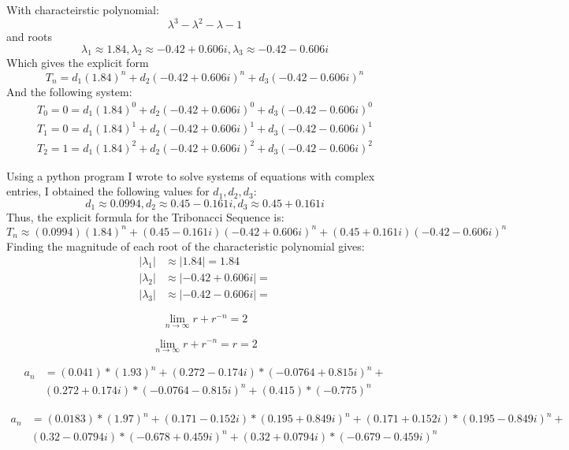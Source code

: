 \documentclass[11pt]{article}
\begin{document}
With characteirstic polynomial:
\[\lambda^3-\lambda^2-\lambda-1\]
and roots
\[\lambda_1 \approx 1.84, \lambda_2 \approx -0.42 + 0.606i, \lambda_3 \approx -0.42 - 0.606i\]
Which gives the explicit form
\[T_n=d_1(1.84)^n+d_2(-0.42 + 0.606i)^n+d_3(-0.42 - 0.606i)^n\]
And the following system:
\begin{align*}
    T_0=0=d_1(1.84)^0+d_2(-0.42 + 0.606i)^0+d_3(-0.42 - 0.606i)^0 \\
    T_1=0=d_1(1.84)^1+d_2(-0.42 + 0.606i)^1+d_3(-0.42 - 0.606i)^1 \\
    T_2=1=d_1(1.84)^2+d_2(-0.42 + 0.606i)^2+d_3(-0.42 - 0.606i)^2
\end{align*}

Using a python program I wrote to solve systems of equations with complex entries, I obtained the following values for $d_1,d_2,d_3$:
\[d_1\approx0.0994,d_2\approx0.45-0.161i,d_3\approx0.45+0.161i\]
Thus, the explicit formula for the Tribonacci Sequence is:
\[T_n\approx(0.0994)(1.84)^n+(0.45-0.161i)(-0.42 + 0.606i)^n+(0.45+0.161i)(-0.42 - 0.606i)^n\]
Finding the magnitude of each root of the characteristic polynomial gives: 
\begin{align*}
    |\lambda_1|&\approx|1.84|=1.84 \\
    |\lambda_2|&\approx|-0.42 + 0.606i|= \\
    |\lambda_3|&\approx|-0.42 - 0.606i|= 
\end{align*}

\newpage 

\[\lim_{n\to\infty}r+r^{-n}=2\]

\[\lim_{n\to\infty}r+r^{-n}=r=2\]

\begin{align*}
    a_n &= (0.041)*(1.93)^n + (0.272 - 0.174i)*(-0.0764 + 0.815i)^n + \\ &(0.272 + 0.174i)*(-0.0764 - 0.815i)^n + (0.415)*(-0.775)^n
\end{align*}

\begin{align*}
    a_n &= (0.0183)*(1.97)^n + (0.171 - 0.152i)*(0.195 + 0.849i)^n + (0.171 + 0.152i)*(0.195 - 0.849i)^n + \\ &(0.32 - 0.0794i)*(-0.678 + 0.459i)^n + (0.32 + 0.0794i)*(-0.679 - 0.459i)^n
\end{align*}
\end{document}
